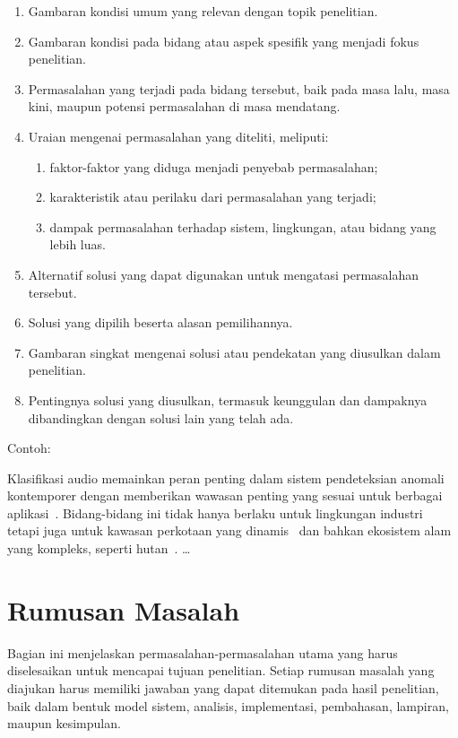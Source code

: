 \begin{enumerate}[topsep=0pt,itemsep=0pt,parsep=0pt,leftmargin=*]
\item Gambaran kondisi umum yang relevan dengan topik penelitian.
\item Gambaran kondisi pada bidang atau aspek spesifik yang menjadi fokus penelitian.
\item Permasalahan yang terjadi pada bidang tersebut, baik pada masa lalu, masa kini, maupun potensi permasalahan di masa mendatang.
\item Uraian mengenai permasalahan yang diteliti, meliputi:
\begin{enumerate}[topsep=0pt,itemsep=0pt,parsep=0pt,leftmargin=*]
\item faktor-faktor yang diduga menjadi penyebab permasalahan;
\item karakteristik atau perilaku dari permasalahan yang terjadi;
\item dampak permasalahan terhadap sistem, lingkungan, atau bidang yang lebih luas.
\end{enumerate}
\item Alternatif solusi yang dapat digunakan untuk mengatasi permasalahan tersebut.
\item Solusi yang dipilih beserta alasan pemilihannya.
\item Gambaran singkat mengenai solusi atau pendekatan yang diusulkan dalam penelitian.
\item Pentingnya solusi yang diusulkan, termasuk keunggulan dan dampaknya dibandingkan dengan solusi lain yang telah ada.
\end{enumerate}


\noindent Contoh:

Klasifikasi audio memainkan peran penting dalam sistem pendeteksian anomali kontemporer dengan memberikan {wawasan penting}\label{rev:ru_min_1a} yang sesuai untuk berbagai aplikasi~\cite{Kilickaya2025, LoScudo2023, Barusco2025}. Bidang-bidang ini tidak hanya berlaku untuk lingkungan industri~\cite{Purohit2019} tetapi juga untuk kawasan perkotaan yang dinamis~\cite{Piczak2015, Salamon2014} dan bahkan ekosistem alam yang kompleks, seperti hutan~\cite{Bandara2023}. \dots
\section{Rumusan Masalah}
Bagian ini menjelaskan permasalahan-permasalahan utama yang harus diselesaikan untuk mencapai tujuan penelitian. Setiap rumusan masalah yang diajukan harus memiliki jawaban yang dapat ditemukan pada hasil penelitian, baik dalam bentuk model sistem, analisis, implementasi, pembahasan, lampiran, maupun kesimpulan.

